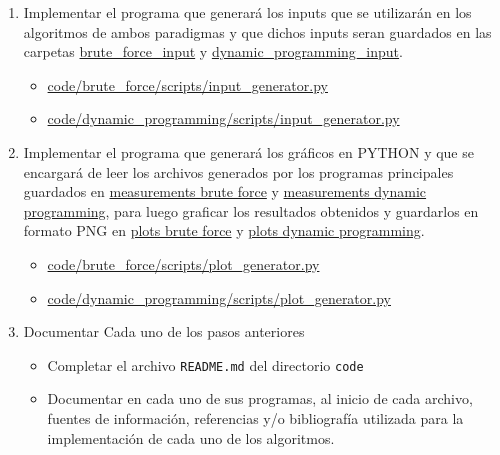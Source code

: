 \begin{enumerate}[(1)]
    \item Implementar el programa que generará los inputs que se utilizarán en los algoritmos de ambos paradigmas y que dichos inputs seran guardados en las carpetas \href{https://github.com/ianCooperA/INF221-2025-1-TAREA-2/tree/main/code/brute_force/data/brute_force_input}{brute\_force\_input} y \href{https://github.com/ianCooperA/INF221-2025-1-TAREA-2/blob/main/code/dynamic_programming/scripts/input_generator.py}{dynamic\_programming\_input}. 
    \begin{itemize}
        \item \href{https://github.com/ianCooperA/INF221-2025-1-TAREA-2/blob/main/code/brute_force/scripts/input_generator.py}{code/brute\_force/scripts/input\_generator.py}
        \item \href{https://github.com/ianCooperA/INF221-2025-1-TAREA-2/blob/main/code/dynamic_programming/scripts/input_generator.py}{code/dynamic\_programming/scripts/input\_generator.py}
    \end{itemize}
    
    \item Implementar el programa que generará los gráficos en PYTHON y que se encargará de leer los archivos generados por los programas principales guardados en  \href{https://github.com/ianCooperA/INF221-2025-1-TAREA-2/tree/main/code/brute_force/data/measurements/}{measurements brute force} y \href{https://github.com/ianCooperA/INF221-2025-1-TAREA-2/tree/main/code/dynamic_programming/data/measurements}{measurements dynamic programming}, para luego graficar los resultados obtenidos y guardarlos en formato PNG en  \href{https://github.com/ianCooperA/INF221-2025-1-TAREA-2/tree/main/code/brute_force/data/plots}{plots brute force} y \href{https://github.com/ianCooperA/INF221-2025-1-TAREA-2/tree/main/code/dynamic_programming/data/plots}{plots dynamic programming}.
    \begin{itemize}
        \item \href{https://github.com/ianCooperA/INF221-2025-1-TAREA-2/blob/main/code/brute_force/scripts/plot_generator.py}{code/brute\_force/scripts/plot\_generator.py}
        \item \href{https://github.com/ianCooperA/INF221-2025-1-TAREA-2/blob/main/code/dynamic_programming/scripts/plot_generator.py}{code/dynamic\_programming/scripts/plot\_generator.py}
    \end{itemize}
    \item Documentar Cada uno de los pasos anteriores
    \begin{itemize}
        \item Completar el archivo \texttt{README.md} del directorio \texttt{code}
        \item Documentar en cada uno de sus programas, al inicio de cada archivo, fuentes de información, referencias y/o bibliografía utilizada para la implementación de cada uno de los algoritmos.
    \end{itemize}
\end{enumerate}

